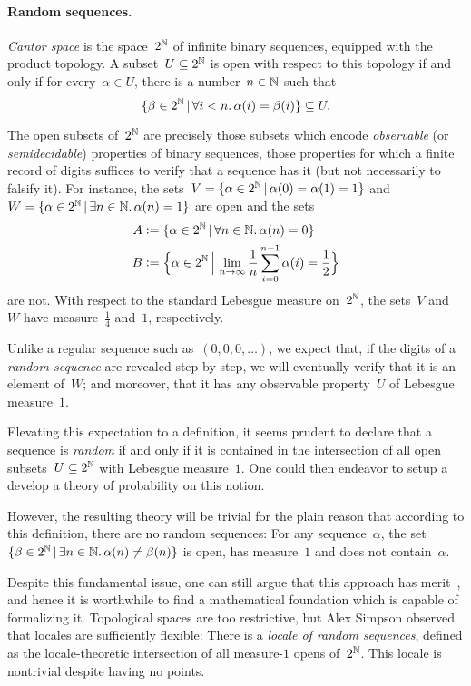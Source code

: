 \documentclass{ws-rv9x6}
\begin{document}
{\paragraph{Random sequences.} \emph{Cantor space} is the space~$2^{\mathbb{N}}$ of
infinite binary sequences, equipped with the product topology. A subset~$U
\subseteq 2^{\mathbb{N}}$ is open with respect to this topology if and only if for
every~$\alpha \in U$, there is a number~$n \in \mathbb{N}$ such that
\[ \{ \beta \in 2^{\mathbb{N}} \,|\, \forall i < n\mathpunct{.} \alpha(i) = \beta(i) \} \subseteq U. \]

The open subsets of~$2^{\mathbb{N}}$ are precisely those subsets which encode
\emph{observable} (or \emph{semidecidable}) properties of binary sequences,
those properties for which a finite record of digits suffices to verify that a
sequence has it (but not necessarily to falsify it). For instance, the sets~$V
= \{ \alpha \in 2^{\mathbb{N}} \,|\, \alpha(0) = \alpha(1) = 1 \}$ and~$W = \{
\alpha \in 2^{\mathbb{N}} \,|\, \exists n\in\mathbb{N}\mathpunct{.} \alpha(n) = 1 \}$ are open and the sets
\begin{align*}
  A &\vcentcolon= \{ \alpha \in 2^{\mathbb{N}} \,|\, \forall n\in\mathbb{N}\mathpunct{.} \alpha(n) = 0 \} \\
  B &\vcentcolon= \Bigl\{ \alpha \in 2^{\mathbb{N}} \,\Big|\, \lim_{n \to \infty} \frac{1}{n} \sum_{i=0}^{n-1} \alpha(i) = \frac{1}{2} \Bigr\}
\end{align*}
are not. With respect to the standard Lebesgue measure on~$2^{\mathbb{N}}$, the sets~$V$
and~$W$ have measure~$\frac{1}{4}$ and~$1$, respectively.

Unlike a regular sequence such as~$(0,0,0,\ldots)$, we expect that, if the
digits of a \emph{random sequence} are revealed step by step, we will
eventually verify that it is an element of~$W$; and moreover, that it has any
observable property~$U$ of Lebesgue measure~$1$.

Elevating this expectation to a definition, it seems prudent to declare that a
sequence is \emph{random} if and only if it is contained in the intersection of
all open subsets~$U \subseteq 2^{\mathbb{N}}$ with Lebesgue measure~$1$. One could then
endeavor to setup a develop a theory of probability on this notion.

However, the resulting theory will be trivial for the plain reason that
according to this definition, there are no random sequences: For any
sequence~$\alpha$, the set~$\{ \beta \in 2^{\mathbb{N}} \,|\, \exists n \in \mathbb{N}\mathpunct{.}
\alpha(n) \neq \beta(n) \}$ is open, has measure~$1$ and does not
contain~$\alpha$.

Despite this fundamental issue, one can still argue that this approach has
merit~\cite{simpson:randomness}, and hence it is worthwhile to find a
mathematical foundation which is capable of formalizing it. Topological
spaces are too restrictive, but Alex Simpson observed that locales are
sufficiently flexible: There is a \emph{locale of random sequences}, defined as
the locale-theoretic intersection of all measure-$1$ opens of~$2^{\mathbb{N}}$. This
locale is nontrivial despite having no points.


}
\end{document}
